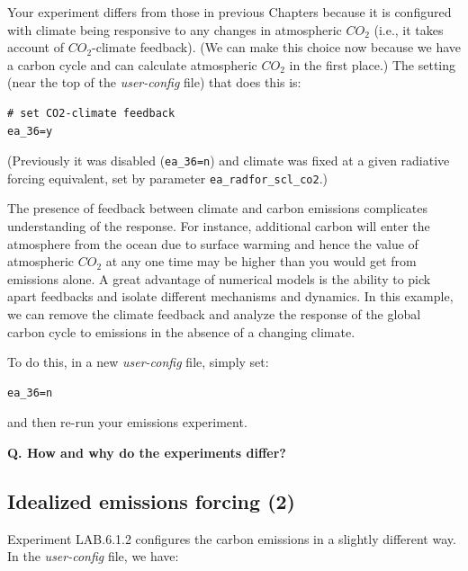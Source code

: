 Your experiment differs from those in previous Chapters because it is configured with climate being responsive to any changes in atmospheric \(CO_{2}\) (i.e., it takes account of \(CO_{2}\)-climate feedback). (We can make this choice now because we have a carbon cycle and can calculate atmospheric $CO_{2}$ in the first place.) The setting (near the top of the \textit{user-config} file) that does this is:
\vspace{-2mm}\small\begin{verbatim}
# set CO2-climate feedback
ea_36=y
\end{verbatim}\normalsize\vspace{-2mm}
(Previously it was disabled (\texttt{\small ea\_36=n}) and climate was fixed at a given radiative forcing equivalent, set by parameter \texttt{\small ea\_radfor\_scl\_co2}.)

\vspace{1mm}
The presence of feedback between climate and carbon emissions complicates understanding of the response. For instance, additional carbon will enter the atmosphere from the ocean due to surface warming and hence the value of atmospheric \(CO_{2}\) at any one time may be higher than you would get from emissions alone. A great advantage of numerical models is the ability to pick apart feedbacks and isolate different mechanisms and dynamics. In this example, we can remove the climate feedback and analyze the response of the global carbon cycle to emissions in the absence of a changing climate.

\vspace{1mm}
To do this, in a new \textit{user-config} file, simply set:
\vspace{-2mm}\small\begin{verbatim}
ea_36=n
\end{verbatim}\normalsize\vspace{-2mm}
and then re-run your emissions experiment.

\vspace{1mm}
\noindent \textbf{Q. How and why do the experiments differ?}

\newpage

\subsection{Idealized emissions forcing (2)}

Experiment \textsf{\footnotesize LAB.6.1.2} configures the carbon emissions in a slightly different way. In the \textit{user-config} file, we have:

